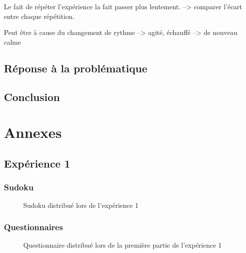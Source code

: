 \documentclass[12pt,fleqn,oneside,french,openany]{book} %
\begin{document}
Le fait de répéter l'expérience la fait passer plus lentement.
--> comparer l'écart entre chaque répétition.

Peut être à cause du changement de rythme --> agité, échauffé --> de nouveau calme

\newpage
\section{Réponse à la problématique} \label{sec:reponseProb}

\newpage
\section{Conclusion} \label{sec:conclusion}




\appendix
\chapter{Annexes} \label{cha:annexes}
\section*{Expérience 1}

\subsection*{Sudoku} \label{sec:Sudoku}
\begin{figure}[htp]  %
	\caption{Sudoku distribué lors de l'expérience 1}
\end{figure}  

\clearpage
\subsection*{Questionnaires} \label{sec:Questionnaires}
\begin{figure}[htp] 
	\caption{Questionnaire distribué lors de la première partie de l'expérience 1}
\end{figure}
\end{document}
